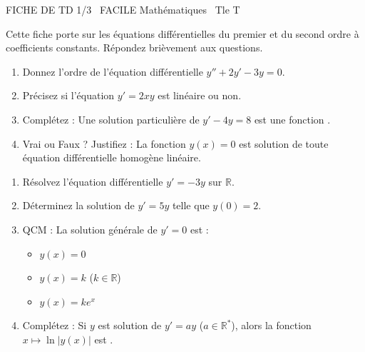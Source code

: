 \documentclass[11pt]{article}
\begin{document}
\begin{tcolorbox}[enhanced,colback=popink,colframe=popink,arc=10pt,boxrule=0pt,left=12pt,right=12pt,top=9pt,bottom=9pt]
{\color{white}\popxbold\small FICHE DE TD 1/3 \textbullet\ FACILE \hfill Mathématiques \textbullet\ Tle T\par}
\end{tcolorbox}
\vspace{4pt}
\noindent Cette fiche porte sur les équations différentielles du premier et du second ordre à coefficients constants. Répondez brièvement aux questions.

\begin{exercice}
\begin{enumerate}
    \item Donnez l'ordre de l'équation différentielle $y'' + 2y' - 3y = 0$.
    \item Précisez si l'équation $y' = 2xy$ est linéaire ou non.
    \item Complétez : Une solution particulière de $y' - 4y = 8$ est une fonction \underline{\hspace{4cm}}.
    \item Vrai ou Faux ? Justifiez : La fonction $y(x) = 0$ est solution de toute équation différentielle homogène linéaire.
\end{enumerate}
\end{exercice}

\begin{exercice}[Équation $y' = ay$]
\begin{enumerate}
    \item Résolvez l'équation différentielle $y' = -3y$ sur $\mathbb{R}$.
    \item Déterminez la solution de $y' = 5y$ telle que $y(0) = 2$.
    \item QCM : La solution générale de $y' = 0$ est :
    \begin{itemize}
        \item[A)] $y(x) = 0$
        \item[B)] $y(x) = k$ ($k \in \mathbb{R}$)
        \item[C)] $y(x) = ke^{x}$
    \end{itemize}
    \item Complétez : Si $y$ est solution de $y' = ay$ ($a \in \mathbb{R}^*$), alors la fonction $x \mapsto \ln|y(x)|$ est \underline{\hspace{4cm}}.
\end{enumerate}
\end{exercice}
\end{document}
